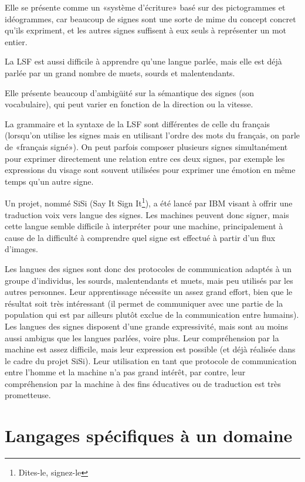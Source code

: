 \documentclass[french,a4paper]{article}
\begin{document}
Elle se présente comme un «système d'écriture» basé sur des
pictogrammes et idéogrammes, car beaucoup de signes sont une sorte de
mime du concept concret qu'ils expriment, et les autres signes
suffisent à eux seuls à représenter un mot entier.

La LSF est aussi difficile à apprendre qu'une langue parlée, mais elle
est déjà parlée par un grand nombre de muets, sourds et malentendants.

Elle présente beaucoup d'ambigüité sur la sémantique des signes (son
vocabulaire), qui peut varier en fonction de la direction ou la
vitesse.

La grammaire et la syntaxe de la LSF sont différentes de celle du
français (lorsqu'on utilise les signes mais en utilisant l'ordre des
mots du français, on parle de «français signé»). On peut parfois
composer plusieurs signes simultanément pour exprimer directement une
relation entre ces deux signes, par exemple les expressions du visage
sont souvent utilisées pour exprimer une émotion en même temps qu'un
autre signe.

Un projet, nommé SiSi (Say It Sign It\footnote{Dites-le, signez-le}),
a été lancé par IBM visant à offrir une traduction voix vers langue
des signes. Les machines peuvent donc signer, mais cette langue semble
difficile à interpréter pour une machine, principalement à cause de la
difficulté à comprendre quel signe est effectué à partir d'un flux
d'images.

Les langues des signes sont donc des protocoles de communication
adaptés à un groupe d'individus, les sourds, malentendants et muets,
mais peu utilisés par les autres personnes. Leur apprentissage
nécessite un assez grand effort, bien que le résultat soit très
intéressant (il permet de communiquer avec une partie de la population
qui est par ailleurs plutôt exclue de la communication entre
humains). Les langues des signes disposent d'une grande expressivité,
mais sont au moins aussi ambigus que les langues parlées, voire
plus. Leur compréhension par la machine est assez difficile, mais leur
expression est possible (et déjà réalisée dans le cadre du projet
SiSi). Leur utilisation en tant que protocole de communication entre
l'homme et la machine n'a pas grand intérêt, par contre, leur
compréhension par la machine à des fins éducatives ou de traduction
est très prometteuse.

\section{Langages spécifiques à un domaine}
\end{document}
